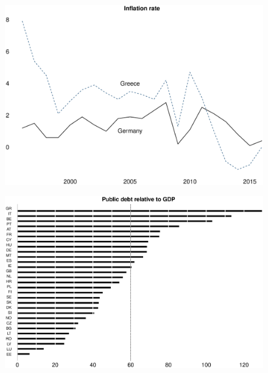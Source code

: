 \documentclass{beamer}
\begin{document}
\begin{frame}
  \begin{figure}
    \includegraphics[scale=.3]{inflation.eps}
  \end{figure}
\end{frame}

\begin{frame}
  \begin{figure}
    \includegraphics[scale=.3]{public_debt.eps}
  \end{figure}
\end{frame}
\end{document}
